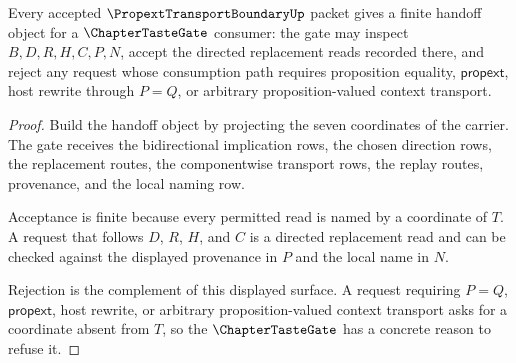 \begin{theorem}
\label{thm:propext-transport-boundary-tastegate-handoff}
Every accepted $\PropextTransportBoundaryUp$ packet gives a finite handoff object for a $\ChapterTasteGate$ consumer: the gate may inspect $B,D,R,H,C,P,N$, accept the directed replacement reads recorded there, and reject any request whose consumption path requires proposition equality, $\mathsf{propext}$, host rewrite through $P=Q$, or arbitrary proposition-valued context transport.
\end{theorem}
\begin{proof}
Build the handoff object by projecting the seven coordinates of the carrier. The gate receives the bidirectional implication rows, the chosen direction rows, the replacement routes, the componentwise transport rows, the replay routes, provenance, and the local naming row.

Acceptance is finite because every permitted read is named by a coordinate of $T$. A request that follows $D$, $R$, $H$, and $C$ is a directed replacement read and can be checked against the displayed provenance in $P$ and the local name in $N$.

Rejection is the complement of this displayed surface. A request requiring $P=Q$, $\mathsf{propext}$, host rewrite, or arbitrary proposition-valued context transport asks for a coordinate absent from $T$, so the $\ChapterTasteGate$ has a concrete reason to refuse it.
\end{proof}

